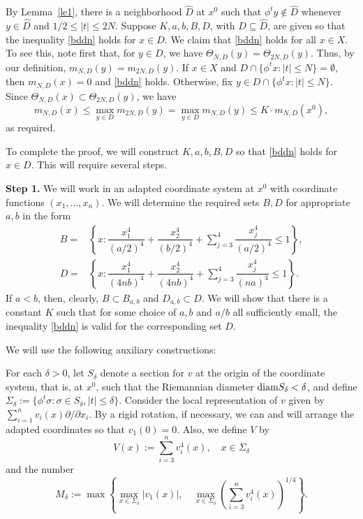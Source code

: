\begin{pf}
By Lemma~\ref{le1},
there is a neighborhood $\widehat{D}$ at $x^0$ such that
$\phi^ty\not\in \widehat{D}$ whenever $y\in\widehat{D}$
and $1/2\le |t|\le 2N$. Suppose $K,a,b,B,D$,
with $D\subseteq \widehat{D}$,
are given so that the inequality \eqref{bddn}
holds for $x\in D$.
We claim that \eqref{bddn} holds for all $x\in X$.
To see this, note first that, for $y\in D$, we have
$\Theta_{N,D}(y) = \Theta_{2N,D}(y)$.
Thus,
by our definition,
$m_{N,D}(y)=m_{2N,D}(y)$.
If  $x\in X$ and $D\cap \{\phi^tx: |t|\le N\}=\emptyset$, then
$m_{N,D}(x)=0$ and \eqref{bddn} holds. Otherwise, fix
$y\in D\cap \{\phi^tx: |t|\le N\}$.
Since $\Theta_{N,D}(x)\subset \Theta_{2N,D}(y)$,
we have
$$
m_{N,D}(x) \leq \max_{y\in D} m_{2N,D}(y)=
\max_{y\in D}m_{N,D}(y)\le K\cdot m_{N,D}(x^0),
$$
as required.

To complete the proof,
we will construct $K,a,b,B,D$ so that \eqref{bddn} holds for $x\in D$.
This will require several steps.

{\bf Step 1.} We will work in an adapted coordinate system at $x^0$ with
coordinate functions $(x_1,\ldots,x_n)$.
We will determine the required sets $B,D$ for appropriate $a,b$ in the
form
\begin{eqnarray*}
B= & \left\{x:
\dfrac{x_1^4}{\left(a/2\right)^4}
+\dfrac{x_2^4}{\left(b/2\right)^4}+
\sum_{j=3}^4\dfrac{x_j^4}{\left(a/2\right)^4}\leq 1
\right\}, \\
D= & \left\{x:
\dfrac{x_1^4}{\left(4nb\right)^4}
+\dfrac{x_2^4}{\left(4nb\right)^4}+
\sum_{j=3}^4\dfrac{x_j^4}{\left(na\right)^4}\leq 1
\right\}.
\end{eqnarray*}
If  $a<b$, then, clearly,
$B\subset B_{a,b}$ and $D_{a,b}\subset D$.
We will show that there is a constant $K$ such that for some choice of
$a,b$ and $a/b$ all sufficiently small,
the inequality \eqref{bddn} is valid  for the corresponding set
$D$.

We will use the following auxiliary constructions:

For each $\delta>0$, let  $S_\delta$ denote a section for
$v$ at the origin of the coordinate
system, that is, at $x^0$, such that the Riemannian diameter
$\hbox{\rm diam} S_\delta<\delta$, and define
$\Sigma_\delta:=\{\phi^t\sigma:\sigma\in S_\delta, |t|\leq\delta\}$.
Consider the local representation of $v$ given by
$\sum_{i=1}^n v_i(x)\partial/\partial x_i$. By a rigid rotation, if
necessary, we can and will arrange the adapted coordinates so that
$v_1(0)=0$. Also, we define $V$ by
\[V(x):=\sum_{i=3}^nv^4_i(x), \quad x\in\Sigma_\delta\]
and the number
$$
M_\delta:=\max \left\{
\max_{x\in\Sigma_\delta} |v_1(x)|,\quad
\max_{x\in\Sigma_\delta}
\left(\sum_{i=3}^nv^4_i(x)\right)^{1/4}\right\}.
$$


\end{pf}
